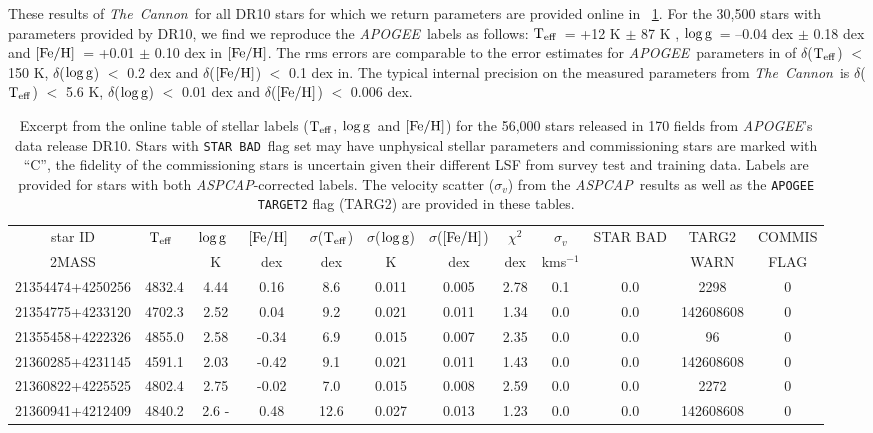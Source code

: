 \documentclass[12pt, preprint]{aastex}
\newcommand{\tc}{\textsl{The~Cannon}}
\newcommand{\apogee}{\textsl{APOGEE}}
\newcommand{\aspcap}{\textsl{ASPCAP}}
\newcommand{\badstar}{\texttt{STAR BAD}}
\newcommand{\teff}{\mbox{$\rm T_{eff}$}}
\newcommand{\feh}{\mbox{$\rm [Fe/H]$}}
\newcommand{\logg}{\mbox{$\rm \log g$}}
\begin{document}
These results of \tc\ for all DR10 stars for which we return parameters are provided online in \tablename~\ref{tab:online}. 
For the 30,500 stars with parameters provided by DR10, we find we reproduce the \apogee\ labels as follows: 
\teff\ = +12 K $\pm$ 87 K , \logg\ = --0.04 dex $\pm$ 0.18 dex and \feh\ = +0.01 $\pm$ 0.10 dex in \feh. 
The rms errors are comparable to the error estimates for \apogee\ parameters in \citet{Meszaros2013} 
of $\delta$(\teff) $<$ 150 K, $\delta$(\logg) $<$ 0.2 dex and $\delta$(\feh) $<$ 0.1 dex in. 
The typical internal precision on the measured parameters from \tc\ is $\delta$(\teff) $<$ 5.6 K, $\delta$(\logg) $<$ 0.01 dex and $\delta$(\feh) $<$ 0.006 dex.

\begin{table}[!h]
\tiny{
\centering
\caption{Excerpt from the online table of stellar labels (\teff, \logg\ and \feh) for the 56,000 stars released in 170 fields from \apogee 's data release DR10. Stars with \badstar\ flag set may have unphysical stellar parameters and commissioning stars are marked with ``C'', the fidelity of the commissioning stars is uncertain given their different LSF from survey test and training data. Labels are provided for stars with both \aspcap-corrected labels. The velocity scatter ($\sigma_v$) from the \aspcap\ results as well as the \texttt{APOGEE TARGET2} flag (TARG2) are provided in these tables.} 
\begin{tabular}{| c | c | c |  c | c | c |  c | c | c | c | c | c | } %
\hline
star ID  & \teff\ & \logg\ & \feh\ & $\sigma$(\teff) & $\sigma$(\logg) & $\sigma$(\feh) & $\chi^2$ & \tiny{$\sigma_{v}$} & \tiny{STAR BAD} & \tiny{TARG2}& \tiny{COMMIS} \\
{2MASS} &  & K &  dex  & dex & K & dex & dex & kms$^{-1}$ & &  \tiny{WARN} & \tiny{ FLAG}  \\    
\hline
\tiny{21354474+4250256} & 4832.4  & 4.44  & 0.16  & 8.6  & 0.011  & 0.005  & 2.78  & 0.1  & 0.0  & 2298 &0 \\
\tiny{21354775+4233120} & 4702.3  & 2.52  & 0.04  & 9.2  & 0.021  & 0.011  & 1.34  & 0.0  & 0.0  & 142608608 & 0 \\
\tiny{21355458+4222326} & 4855.0  & 2.58  & -0.34 &  6.9 &  0.015 &  0.007 &  2.35  & 0.0 &  0.0 &  96 &  0 \\
\tiny{21360285+4231145} & 4591.1  & 2.03  & -0.42 &  9.1 &  0.021 &  0.011 &  1.43  & 0.0 &  0.0 &  142608608 &  0 \\
\tiny{21360822+4225525} & 4802.4  & 2.75  & -0.02 &  7.0 &  0.015 &  0.008 &  2.59  & 0.0 &  0.0 &  2272 &  0 \\
\tiny{21360941+4212409} & 4840.2  & 2.6 - & 0.48  & 12.6 &  0.027 &  0.013 &  1.23  & 0.0 &  0.0 &  142608608 &  0 \\
 \hline
\end{tabular}
\label{tab:online} }
\end{table}  
 
\end{document}
